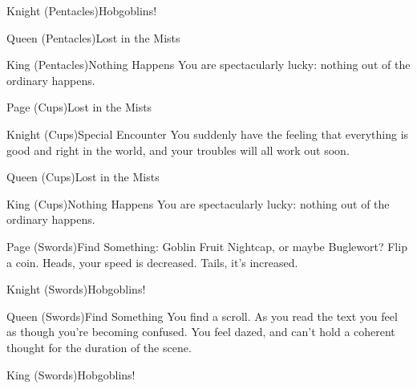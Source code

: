 \documentclass[green]{gl2018}
\begin{document}
\begin{location}{Knight (Pentacles)}{Hobgoblins!}
\end{location}
\begin{location}{Queen (Pentacles)}{Lost in the Mists}
\end{location}
\begin{location}{King (Pentacles)}{Nothing Happens}
You are spectacularly lucky: nothing out of the ordinary happens.
\end{location}
\begin{location}{Page (Cups)}{Lost in the Mists}
\end{location}
\begin{location}{Knight (Cups)}{Special Encounter}
You suddenly have the feeling that everything is good and right in the world, and your troubles will all work out soon.
\end{location}
\begin{location}{Queen (Cups)}{Lost in the Mists}
\end{location}
\begin{location}{King (Cups)}{Nothing Happens}
You are spectacularly lucky: nothing out of the ordinary happens.
\end{location}
\begin{location}{Page (Swords)}{Find Something: Goblin Fruit}
Nightcap, or maybe Buglewort?  Flip a coin.  Heads, your speed is decreased.  Tails, it's increased.
\end{location}
\begin{location}{Knight (Swords)}{Hobgoblins!}
\end{location}
\begin{location}{Queen (Swords)}{Find Something}
You find a scroll. As you read the text you feel as though you're becoming confused.  You feel dazed, and can't hold a coherent thought for the duration of the scene.
\end{location}
\begin{location}{King (Swords)}{Hobgoblins!}
\end{location}
\end{document}
